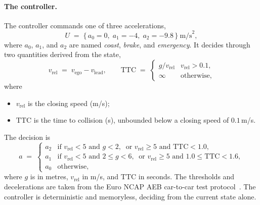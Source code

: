 \documentclass[11pt,a4paper]{article}
\newcommand{\vego}{v_{\text{ego}}}
\newcommand{\vlead}{v_{\text{lead}}}
\theoremstyle{plain}
\theoremstyle{remark}
\begin{document}
	\paragraph{The controller.}
	The controller commands one of three accelerations,
	\begin{equation}
		U \;=\; \{\,a_0 = 0,\; a_1 = -4,\; a_2 = -9.8\,\}\ \text{m/s}^2,
		\label{eq:actions}
	\end{equation}
	where $a_0$, $a_1$, and $a_2$ are named \emph{coast}, \emph{brake}, and \emph{emergency}. It decides through two quantities derived from the state,
	\begin{equation}
		v_{\text{rel}} \;=\; \vego - \vlead, \qquad
		\mathrm{TTC} \;=\;
		\begin{cases}
			g / v_{\text{rel}} & v_{\text{rel}} > 0.1,\\
			\infty & \text{otherwise},
		\end{cases}
		\label{eq:vreltcc}
	\end{equation}
	where
	\begin{itemize}
		\item $v_{\text{rel}}$ is the closing speed (m/s);
		\item $\mathrm{TTC}$ is the time to collision (s), unbounded below a closing speed of $0.1$\,m/s.
	\end{itemize}
	The decision is
	\begin{equation}
		a \;=\;
		\begin{cases}
			a_2 & \text{if } v_{\text{rel}} < 5 \text{ and } g < 2, \ \text{ or } v_{\text{rel}} \ge 5 \text{ and } \mathrm{TTC} < 1.0,\\
			a_1 & \text{if } v_{\text{rel}} < 5 \text{ and } 2 \le g < 6, \ \text{ or } v_{\text{rel}} \ge 5 \text{ and } 1.0 \le \mathrm{TTC} < 1.6,\\
			a_0 & \text{otherwise},
		\end{cases}
		\label{eq:controller}
	\end{equation}
	where $g$ is in metres, $v_{\text{rel}}$ in m/s, and $\mathrm{TTC}$ in seconds. The thresholds and decelerations are taken from the Euro NCAP AEB car-to-car test protocol~\cite{EuroNCAP}. The controller is deterministic and memoryless, deciding from the current state alone.
	
\end{document}
